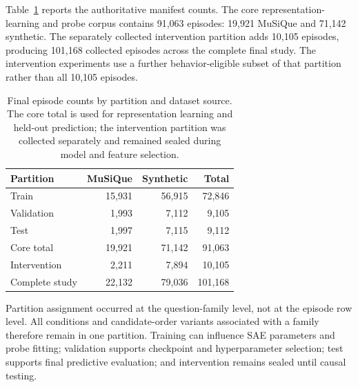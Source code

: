 Table~\ref{tab:final-dataset-composition} reports the authoritative manifest
counts. The core representation-learning and probe corpus contains 91,063
episodes: 19,921 MuSiQue and 71,142 synthetic. The separately collected
intervention partition adds 10,105 episodes, producing 101,168 collected
episodes across the complete final study. The intervention experiments use a
further behavior-eligible subset of that partition rather than all 10,105
episodes.

\begin{table}[htbp]
    \centering
    \caption{Final episode counts by partition and dataset source. The core
    total is used for representation learning and held-out prediction; the
    intervention partition was collected separately and remained sealed during
    model and feature selection.}
    \label{tab:final-dataset-composition}
    \begin{tabular}{lrrr}
        \toprule
        Partition & MuSiQue & Synthetic & Total \\
        \midrule
        Train & 15,931 & 56,915 & 72,846 \\
        Validation & 1,993 & 7,112 & 9,105 \\
        Test & 1,997 & 7,115 & 9,112 \\
        Core total & 19,921 & 71,142 & 91,063 \\
        Intervention & 2,211 & 7,894 & 10,105 \\
        Complete study & 22,132 & 79,036 & 101,168 \\
        \bottomrule
    \end{tabular}
\end{table}

Partition assignment occurred at the question-family level, not at the episode
row level. All conditions and candidate-order variants associated with a family
therefore remain in one partition. Training can influence SAE parameters and
probe fitting; validation supports checkpoint and hyperparameter selection;
test supports final predictive evaluation; and intervention remains sealed
until causal testing.

